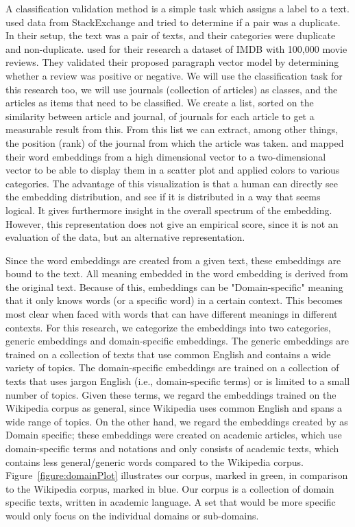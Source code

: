 \documentclass[../../Thesis.tex]{subfiles}
\begin{document}
\begin{jumpin}
A classification validation method is a simple task which assigns a label to a text. \citet{lau2016empirical} used data from StackExchange and tried to determine if a pair was a duplicate. In their setup, the text was a pair of texts, and their categories were duplicate and non-duplicate. \citet{le2014distributed} used for their research a dataset of IMDB with 100,000 movie reviews. They validated their proposed paragraph vector model by determining whether a review was positive or negative. We will use the classification task for this research too, we will use journals (collection of articles) as classes, and the articles as items that need to be classified. We create a list, sorted on the similarity between article and journal, of journals for each article to get a measurable result from this. From this list we can extract, among other things, the position (rank) of the journal from which the article was taken.
\citet{dai2015document} and \citet{hinton2003stochastic} mapped their word embeddings from a high dimensional vector to a two-dimensional vector to be able to display them in a scatter plot and applied colors to various categories. The advantage of this visualization is that a human can directly see the embedding distribution, and see if it is distributed in a way that seems logical. It gives furthermore insight in the overall spectrum of the embedding. However, this representation does not give an empirical score, since it is not an evaluation of the data, but an alternative representation. 
\end{jumpin}
Since the word embeddings are created from a given text, these embeddings are bound to the text. All meaning embedded in the word embedding is derived from the original text. Because of this, embeddings can be "Domain-specific" meaning that it only knows words (or a specific word) in a certain context. This becomes most clear when faced with words that can have different meanings in different contexts. For this research, we categorize the embeddings into two categories, generic embeddings and domain-specific embeddings. The generic embeddings are trained on a collection of texts that use common English and contains a wide variety of topics. The domain-specific embeddings are trained on a collection of texts that uses jargon English (i.e., domain-specific terms) or is limited to a small number of topics. Given these terms, we regard the embeddings trained on the Wikipedia corpus\cite{lai2016generate, pennington2014glove, dai2015document, lau2016empirical, schnabel2015evaluation} as general, since Wikipedia uses common English and spans a wide range of topics. On the other hand, we regard the embeddings created by \citet{Truong2017Thesis} as Domain specific; these embeddings were created on academic articles, which use domain-specific terms and notations and only consists of academic texts, which contains less general/generic words compared to the Wikipedia corpus. Figure~\ref{figure:domainPlot} illustrates our corpus, marked in green, in comparison to the Wikipedia corpus, marked in blue. Our corpus is a collection of domain specific texts, written in academic language. A set that would be more specific would only focus on the individual domains or sub-domains.
\end{document}
